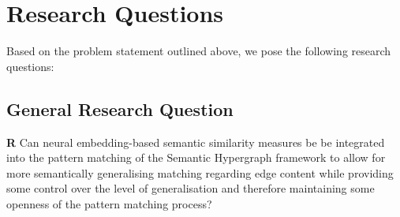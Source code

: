 \documentclass[11pt]{scrreprt}
\begin{document}
\section{Research Questions}
\label{sec:research-questions}
Based on the problem statement outlined above, we pose the following research questions:

\subsection{General Research Question}
\textbf{R} Can neural embedding-based semantic similarity measures be be integrated into the pattern matching of the Semantic Hypergraph framework to allow for more semantically generalising matching regarding edge content while providing some control over the level of generalisation and therefore maintaining some openness of the pattern matching process?
\end{document}

